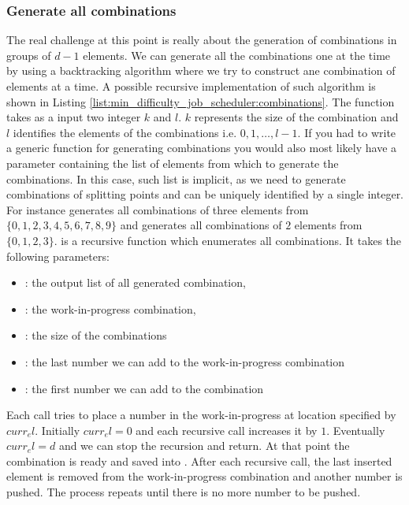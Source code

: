 \subsubsection{Generate all combinations}
The real challenge at this point is really about the generation of combinations in groups of $d-1$
elements. We can generate all the combinations one at the time by using a backtracking algorithm
where we try to construct ane combination of elements at a time. A possible recursive implementation
of such algorithm is shown in Listing \ref{list:min_difficulty_job_scheduler:combinations}. The
function  takes as a input two integer $k$ and $l$. $k$ represents
the size of the combination and $l$ identifies the elements of the combinations i.e. $0,1,\ldots,
l-1$. If you had to write a generic function for generating combinations you would also most likely have a parameter 
containing the list of elements from which to generate the combinations. In this case, such list is implicit,
as we need to generate combinations of splitting points and can be uniquely identified by a single integer.
For instance  generates all combinations of three
elements from $\{0,1,2,3,4,5,6,7,8,9\}$ and  generates all
combinations of $2$ elements from $\{0,1,2,3\}$.  is a
recursive function which enumerates all combinations. It takes the following parameters:
\begin{itemize}
    \item {}: the output list of all
    generated combination,
    \item {}: the work-in-progress combination,
    \item {}: the size of the combinations
    \item {}: the last number we can add to the work-in-progress combination
    \item {}: the first number we can add to the combination
\end{itemize}
Each call tries to place a number  in the work-in-progress  at location specified by $curr_el$.
Initially $curr_el = 0$ and each recursive call increases it by $1$. Eventually $curr_el = d$ and we can stop the recursion and return.
At that point the combination is ready and saved into
. 
After each recursive call, the last inserted element is removed from the
work-in-progress combination and another number is pushed. The process repeats until
there is no more number to be pushed.


